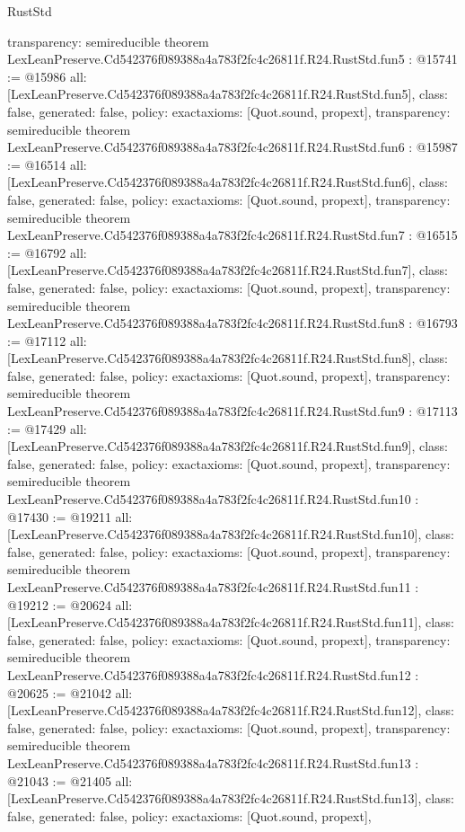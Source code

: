 \begin{lexlean}{RustStd}
\begin{coremodule}
{  transparency: semireducible
}
theorem LexLeanPreserve.Cd542376f089388a4a783f2fc4c26811f.R24.RustStd.fun5 : @15741 := @15986 {
  all: [LexLeanPreserve.Cd542376f089388a4a783f2fc4c26811f.R24.RustStd.fun5],
  class: false,
  generated: false,
  policy: exact{axioms: [Quot.sound, propext]},
  transparency: semireducible
}
theorem LexLeanPreserve.Cd542376f089388a4a783f2fc4c26811f.R24.RustStd.fun6 : @15987 := @16514 {
  all: [LexLeanPreserve.Cd542376f089388a4a783f2fc4c26811f.R24.RustStd.fun6],
  class: false,
  generated: false,
  policy: exact{axioms: [Quot.sound, propext]},
  transparency: semireducible
}
theorem LexLeanPreserve.Cd542376f089388a4a783f2fc4c26811f.R24.RustStd.fun7 : @16515 := @16792 {
  all: [LexLeanPreserve.Cd542376f089388a4a783f2fc4c26811f.R24.RustStd.fun7],
  class: false,
  generated: false,
  policy: exact{axioms: [Quot.sound, propext]},
  transparency: semireducible
}
theorem LexLeanPreserve.Cd542376f089388a4a783f2fc4c26811f.R24.RustStd.fun8 : @16793 := @17112 {
  all: [LexLeanPreserve.Cd542376f089388a4a783f2fc4c26811f.R24.RustStd.fun8],
  class: false,
  generated: false,
  policy: exact{axioms: [Quot.sound, propext]},
  transparency: semireducible
}
theorem LexLeanPreserve.Cd542376f089388a4a783f2fc4c26811f.R24.RustStd.fun9 : @17113 := @17429 {
  all: [LexLeanPreserve.Cd542376f089388a4a783f2fc4c26811f.R24.RustStd.fun9],
  class: false,
  generated: false,
  policy: exact{axioms: [Quot.sound, propext]},
  transparency: semireducible
}
theorem LexLeanPreserve.Cd542376f089388a4a783f2fc4c26811f.R24.RustStd.fun10 : @17430 := @19211 {
  all: [LexLeanPreserve.Cd542376f089388a4a783f2fc4c26811f.R24.RustStd.fun10],
  class: false,
  generated: false,
  policy: exact{axioms: [Quot.sound, propext]},
  transparency: semireducible
}
theorem LexLeanPreserve.Cd542376f089388a4a783f2fc4c26811f.R24.RustStd.fun11 : @19212 := @20624 {
  all: [LexLeanPreserve.Cd542376f089388a4a783f2fc4c26811f.R24.RustStd.fun11],
  class: false,
  generated: false,
  policy: exact{axioms: [Quot.sound, propext]},
  transparency: semireducible
}
theorem LexLeanPreserve.Cd542376f089388a4a783f2fc4c26811f.R24.RustStd.fun12 : @20625 := @21042 {
  all: [LexLeanPreserve.Cd542376f089388a4a783f2fc4c26811f.R24.RustStd.fun12],
  class: false,
  generated: false,
  policy: exact{axioms: [Quot.sound, propext]},
  transparency: semireducible
}
theorem LexLeanPreserve.Cd542376f089388a4a783f2fc4c26811f.R24.RustStd.fun13 : @21043 := @21405 {
  all: [LexLeanPreserve.Cd542376f089388a4a783f2fc4c26811f.R24.RustStd.fun13],
  class: false,
  generated: false,
  policy: exact{axioms: [Quot.sound, propext]},
}
\end{coremodule}
\end{lexlean}
